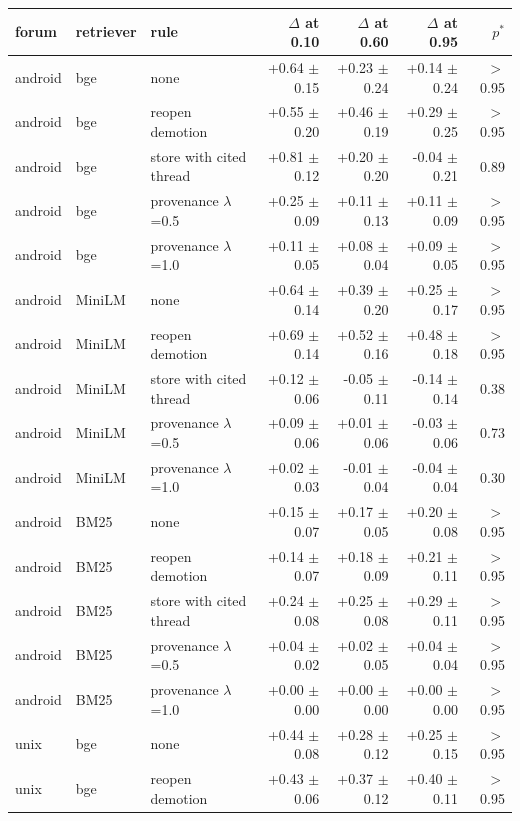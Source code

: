 \begin{tabular}{lllrrrr}
\toprule
forum & retriever & rule & $\Delta$ at 0.10 & $\Delta$ at 0.60 & $\Delta$ at 0.95 & $p^*$ \\
\midrule
android & bge & none & +0.64 $\pm$ 0.15 & +0.23 $\pm$ 0.24 & +0.14 $\pm$ 0.24 & $>$0.95 \\
android & bge & reopen demotion & +0.55 $\pm$ 0.20 & +0.46 $\pm$ 0.19 & +0.29 $\pm$ 0.25 & $>$0.95 \\
android & bge & store with cited thread & +0.81 $\pm$ 0.12 & +0.20 $\pm$ 0.20 & -0.04 $\pm$ 0.21 & 0.89 \\
android & bge & provenance $\lambda$=0.5 & +0.25 $\pm$ 0.09 & +0.11 $\pm$ 0.13 & +0.11 $\pm$ 0.09 & $>$0.95 \\
android & bge & provenance $\lambda$=1.0 & +0.11 $\pm$ 0.05 & +0.08 $\pm$ 0.04 & +0.09 $\pm$ 0.05 & $>$0.95 \\
\midrule
android & MiniLM & none & +0.64 $\pm$ 0.14 & +0.39 $\pm$ 0.20 & +0.25 $\pm$ 0.17 & $>$0.95 \\
android & MiniLM & reopen demotion & +0.69 $\pm$ 0.14 & +0.52 $\pm$ 0.16 & +0.48 $\pm$ 0.18 & $>$0.95 \\
android & MiniLM & store with cited thread & +0.12 $\pm$ 0.06 & -0.05 $\pm$ 0.11 & -0.14 $\pm$ 0.14 & 0.38 \\
android & MiniLM & provenance $\lambda$=0.5 & +0.09 $\pm$ 0.06 & +0.01 $\pm$ 0.06 & -0.03 $\pm$ 0.06 & 0.73 \\
android & MiniLM & provenance $\lambda$=1.0 & +0.02 $\pm$ 0.03 & -0.01 $\pm$ 0.04 & -0.04 $\pm$ 0.04 & 0.30 \\
\midrule
android & BM25 & none & +0.15 $\pm$ 0.07 & +0.17 $\pm$ 0.05 & +0.20 $\pm$ 0.08 & $>$0.95 \\
android & BM25 & reopen demotion & +0.14 $\pm$ 0.07 & +0.18 $\pm$ 0.09 & +0.21 $\pm$ 0.11 & $>$0.95 \\
android & BM25 & store with cited thread & +0.24 $\pm$ 0.08 & +0.25 $\pm$ 0.08 & +0.29 $\pm$ 0.11 & $>$0.95 \\
android & BM25 & provenance $\lambda$=0.5 & +0.04 $\pm$ 0.02 & +0.02 $\pm$ 0.05 & +0.04 $\pm$ 0.04 & $>$0.95 \\
android & BM25 & provenance $\lambda$=1.0 & +0.00 $\pm$ 0.00 & +0.00 $\pm$ 0.00 & +0.00 $\pm$ 0.00 & $>$0.95 \\
\midrule
unix & bge & none & +0.44 $\pm$ 0.08 & +0.28 $\pm$ 0.12 & +0.25 $\pm$ 0.15 & $>$0.95 \\
unix & bge & reopen demotion & +0.43 $\pm$ 0.06 & +0.37 $\pm$ 0.12 & +0.40 $\pm$ 0.11 & $>$0.95 \\

\end{tabular}
